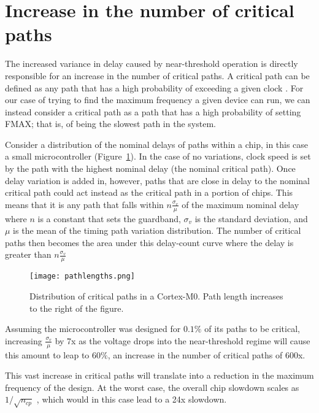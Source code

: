\section{Increase in the number of critical paths}
\label{sec:criticalpaths}

The increased variance in delay caused by near-threshold operation is directly responsible for an increase in the number of critical paths.
A critical path can be defined as any path that has a high probability of exceeding a given clock \cite{Wang:2004bw}.
For our case of trying to find the maximum frequency a given device can run, we can instead consider a critical path as a path that has a high probability of setting FMAX; that is, of being the slowest path in the system.
  
Consider a distribution of the nominal delays of paths within a chip, in this case a small microcontroller (Figure~\ref{fig:normal}).
In the case of no variations, clock speed is set by the path with the highest nominal delay (the nominal critical path).
Once delay variation is added in, however, paths that are close in delay to the nominal critical path could act instead as the critical path in a portion of chips.
This means that it is any path that falls within $n\frac{\sigma_v}{\mu}$ of the maximum nominal delay where $n$ is a constant that sets the guardband, $\sigma_v$ is the standard deviation, and $\mu$ is the mean of the timing path variation distribution.
The number of critical paths then becomes the area under this delay-count curve where the delay is greater than $n\frac{\sigma_v}{\mu}$
 
\begin{figure}[thpb]
    \centering
    \texttt{[image: pathlengths.png]}
    \caption{Distribution of critical paths in a Cortex-M0. Path length increases to the right of the figure.}
    \label{fig:normal}
\end{figure}
 
Assuming the microcontroller was designed for $0.1\%$ of its paths to be critical, increasing $\frac{\sigma_v}{\mu}$ by 7x as the voltage drops into the near-threshold regime will cause this amount  to leap to $60\%$, an increase in the number of critical paths of 600x.

This vast increase in critical paths will translate into a reduction in the maximum frequency of the design. At the worst case, the overall chip slowdown scales as $1/\sqrt{n_{cp}}$ \cite{Bowman:2002cp}, which would in this case lead to a 24x slowdown.
